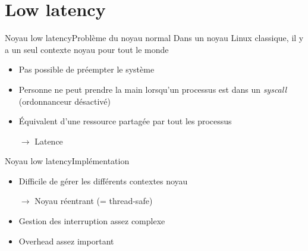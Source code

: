 
\section{Low latency}

\begin{frame}{Noyau low latency}{Problème du noyau normal}
  Dans un  noyau Linux classique, il  y a un seul  contexte noyau pour
  tout le monde
  \begin{itemize}
  \item Pas possible de préempter le système
  \item Personne ne peut prendre  la main lorsqu'un processus est dans
    un \emph{syscall} (ordonnanceur désactivé)
  \item Équivalent d'une ressource partagée par tout les processus
  \item[$\to$] Latence
  \end{itemize}
\end{frame}

\begin{frame}{Noyau low latency}{Implémentation}
  \begin{itemize}
  \item Difficile de gérer les différents contextes noyau
  \item[$\to$] Noyau réentrant (= thread-safe)
  \item Gestion des interruption assez complexe
  \item Overhead assez important
  \end{itemize}
\end{frame}

